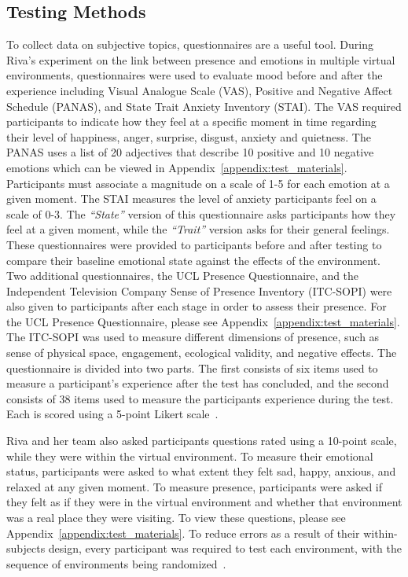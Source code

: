 \documentclass{sigchi}
\newcommand{\inlinequote}[1]{\textit{``#1''}}
\begin{document}
\subsection{Testing Methods}
To collect data on subjective topics, questionnaires are a useful tool. During Riva's experiment on the link between presence and emotions in multiple virtual environments, questionnaires were used to evaluate mood before and after the experience including Visual Analogue Scale (VAS), Positive and Negative Affect Schedule (PANAS), and State Trait Anxiety Inventory (STAI). The VAS required participants to indicate how they feel at a specific moment in time regarding their level of happiness, anger, surprise, disgust, anxiety and quietness. The PANAS uses a list of 20 adjectives that describe 10 positive and 10 negative emotions which can be viewed in Appendix~\ref{appendix:test_materials}. Participants must associate a magnitude on a scale of 1-5 for each emotion at a given moment. The STAI measures the level of anxiety participants feel on a scale of 0-3. The \inlinequote{State} version of this questionnaire asks participants how they feel at a given moment, while the \inlinequote{Trait} version asks for their general feelings. These questionnaires were provided to participants before and after testing to compare their baseline emotional state against the effects of the environment. Two additional questionnaires, the UCL Presence Questionnaire, and the Independent Television Company Sense of Presence Inventory (ITC-SOPI) were also given to participants after each stage in order to assess their presence. For the UCL Presence Questionnaire, please see Appendix~\ref{appendix:test_materials}.
The ITC-SOPI was used to measure different dimensions of presence, such as sense of physical space, engagement, ecological validity, and negative effects. The questionnaire is divided into two parts. The first consists of six items used to measure a participant's experience after the test has concluded, and the second consists of 38 items used to measure the participants experience during the test. Each is scored using a 5-point Likert scale~\cite{riva2007affective}.

Riva and her team also asked participants questions rated using a 10-point scale, while they were within the virtual environment. To measure their emotional status, participants were asked to what extent they felt sad, happy, anxious, and relaxed at any given moment. To measure presence, participants were asked if they felt as if they were in the virtual environment and whether that environment was a real place they were visiting. To view these questions, please see Appendix~\ref{appendix:test_materials}.
To reduce errors as a result of their within-subjects design, every participant was required to test each environment, with the sequence of environments being randomized~\cite{riva2007affective}.
\end{document}
